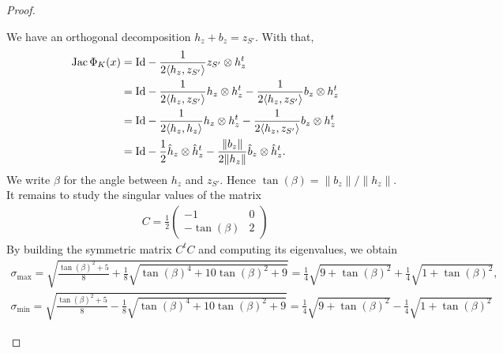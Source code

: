 \documentclass[10pt,letterpaper]{article}
\begin{document}
\begin{proof}
\begin{itemize}
        We have an orthogonal decomposition $h_{z} + b_{z} = z_{S'}$.
        With that,
        \begin{align*}
            \operatorname{{\rm Jac}} \Phi_{K}(x)
            &=
            {\rm Id} 
            - 
            \frac{1}{ 2 \langle h_{z},z_{S'}\rangle }  
            z_{S'} \otimes h_{z}^{t}
            \\
            &=
            {\rm Id} 
            - 
            \frac{1}{ 2 \langle h_{z},z_{S'}\rangle } 
            h_{z} \otimes h_{z}^{t}
            - 
            \frac{1}{ 2 \langle h_{z},z_{S'}\rangle } 
            b_{z} \otimes h_{z}^{t}
            \\
            &=
            {\rm Id} 
            - 
            \frac{1}{ 2 \langle h_{z}, h_{z}\rangle } 
            h_{z} \otimes h_{z}^{t}
            - 
            \frac{1}{ 2 \langle h_{z},z_{S'}\rangle } 
            b_{z} \otimes h_{z}^{t}
            \\
            &=
            {\rm Id} 
            - 
            \frac{1}{ 2 } 
            \hat h_{z} \otimes \hat h_{z}^{t}
            - 
            \frac{ \|b_z\| }{ 2 \| h_{z} \| } 
            \hat b_{z} \otimes \hat h_{z}^{t}
            .
        \end{align*}
        We write $\beta$ for the angle between $h_{z}$ and $z_{S'}$.
        Hence $\tan(\beta) = \| b_z \| / \| h_z \|$. It remains to study the singular values of the matrix 
        \begin{align*}
            C 
            = 
            \frac 1 2 
            \begin{pmatrix}
                -1 & 0 
                \\
                -\tan(\beta) & 2 
            \end{pmatrix}
        \end{align*}
        By building the symmetric matrix $C^{t} C$ and computing its eigenvalues, we obtain 
        \begin{align*}
            \sigma_{\max} 
            = 
            \sqrt{ \frac{ \tan(\beta)^{2} + 5 }{8} + \frac 1 8 \sqrt{ \tan(\beta)^{4} + 10 \tan(\beta)^{2} + 9 } }
            =
            \frac 1 4 \sqrt{ 9 + \tan(\beta)^2 } + \frac 1 4 \sqrt{ 1 + \tan(\beta)^2 }
            ,
            \\
            \sigma_{\min} 
            = 
            \sqrt{ \frac{ \tan(\beta)^{2} + 5 }{8} - \frac 1 8 \sqrt{ \tan(\beta)^{4} + 10 \tan(\beta)^{2} + 9 } }
            =
            \frac 1 4 \sqrt{ 9 + \tan(\beta)^2 } - \frac 1 4 \sqrt{ 1 + \tan(\beta)^2 }

\end{align*}
\end{itemize}
\end{proof}
\end{document}
